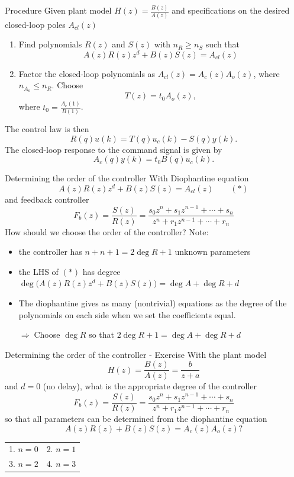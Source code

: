 \documentclass[presentation,aspectratio=169]{beamer}
\begin{document}
\begin{frame}[label={sec:org7845e5f}]{Procedure}
Given plant model \(H(z)=\frac{B(z)}{A(z)}\) and specifications on the desired closed-loop poles \(A_{cl}(z)\)
\begin{enumerate}
\item Find polynomials \(R(z)\) and \(S(z)\) with \(n_R \ge n_S\) such that 
\[ A(z)R(z)z^{d} + B(z)S(z) = A_{cl}(z) \]
\item Factor the closed-loop polynomials as \(A_{cl}(z) = A_c(z)A_o(z)\), where \(n_{A_o} \le n_R\). Choose
\[T(z) = t_0 A_o(z),\] where \(t_0 = \frac{A_c(1)}{B(1)}\).
\end{enumerate}

The control law is then
\[ R(q) u(k) = T(q)u_c(k) - S(q)y(k). \]
The closed-loop response to the command signal is given by
\[ A_c(q)y(k) = t_0 B(q) u_c(k). \]
\end{frame}
\begin{frame}[label={sec:orge8e36f2}]{Determining the order of the controller}
With Diophantine equation 
   \[ A(z)R(z)z^{d} + B(z)S(z) = A_{cl}(z) \qquad (*) \]
and feedback controller
\[F_b(z) = \frac{S(z)}{R(z)} = \frac{s_0z^n + s_1z^{n-1} + \cdots + s_n}{z^n + r_1 z^{n-1} + \cdots + r_n}\]
\alert{How should we choose the order of the controller?} Note:
\begin{itemize}
\item the controller has \(n+n+1 = 2\deg R + 1\) unknown parameters
\item the LHS of \((*)\) has degree \(\deg \big(A(z)R(z)z^d + B(z)S(z)\big) = \deg A + \deg R + d\)
\item The diophantine gives as many (nontrivial) equations as the degree of the polynomials on each side when we set the coefficients equal.

\alert{\(\Rightarrow\;\)Choose \(\deg R\) so that \(2\deg R + 1 = \deg A + \deg R + d\)}
\end{itemize}
\end{frame}


\begin{frame}[label={sec:org4d881a2}]{Determining the order of the controller - Exercise}
With the plant model \[H(z) = \frac{B(z)}{A(z)} = \frac{b}{z + a}\] and \(d=0\) (no delay), what is the appropriate degree of the controller 
\[F_b(z) = \frac{S(z)}{R(z)} = \frac{s_0z^n + s_1z^{n-1} + \cdots + s_n}{z^n + r_1 z^{n-1} + \cdots + r_n}\]
so that all parameters can be determined from the diophantine equation
\[ A(z)R(z) + B(z)S(z) = A_c(z)A_o(z)?\]
\begin{center}
\begin{tabular}{ll}
1. \(n = 0\) & 2. \(n = 1\)\\
3. \(n=2\) & 4. \(n=3\)\\
\end{tabular}
\end{center}
\end{frame}
\end{document}
